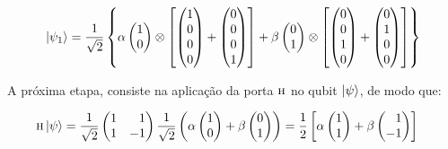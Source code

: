 \begin{equation}\label{eq:psi1}
\ket{\psi_1} = \frac{1}{\sqrt{2}} \left\{  \alpha \begin{pmatrix}
1 \\
0
\end{pmatrix} \otimes \left[ \begin{pmatrix}
1 \\
0 \\
0 \\
0
\end{pmatrix} + \begin{pmatrix}
0 \\
0 \\
0 \\
1
\end{pmatrix}\right] + \beta \begin{pmatrix}
0 \\
1
\end{pmatrix} \otimes \left[ \begin{pmatrix}
0 \\
0 \\
1 \\
0
\end{pmatrix} + \begin{pmatrix}
0 \\
1 \\
0 \\
0
\end{pmatrix}\right] \right\}
\end{equation}

A próxima etapa, consiste na aplicação da porta \(\operatorname{\textsc{h}}\) no qubit $\ket{\psi}$, de modo que:

\begin{equation}\label{eq:halfabeta}
  	\begin{split}
		\HAD \ket{\psi} &= \frac{1}{\sqrt{2}} \begin{pmatrix*}[r]
		1 & 1 \\
		1 & -1
		\end{pmatrix*} \frac{1}{\sqrt{2}}\left(\alpha \begin{pmatrix}
		1 \\
		0 
		\end{pmatrix} + \beta \begin{pmatrix}
		0 \\
		1
		\end{pmatrix} \right) = \frac{1}{2} \left[\alpha \begin{pmatrix}
		1 \\
		1 
		\end{pmatrix} + \beta \begin{pmatrix*}[r]
		1 \\
		-1
		\end{pmatrix*} \right]
  	\end{split}
\end{equation}

